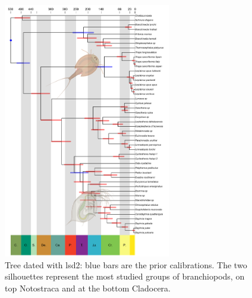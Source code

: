 \begin{figure}[h!]
    \centering
    \includegraphics[width=0.65\textwidth]{Figures/lsd2tree_2.0.png}
    \caption[Tree dated with lsd2]{Tree dated with lsd2: blue bars are the prior calibrations. The two silhouettes represent the most studied groups of branchiopods, on top Notostraca and at the bottom Cladocera.
}
    \label{fig:lsd2tree}
\end{figure}

